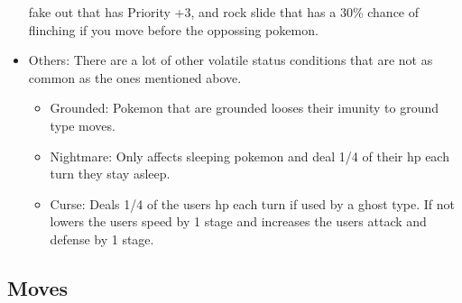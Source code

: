\begin{itemize}
    fake out that has Priority +3, and rock slide that has a 30\% chance of flinching if you move before the oppossing pokemon.
  \item Others: There are a lot of other volatile status conditions that are not as common as the ones mentioned above.
  \begin{itemize}
    \item Grounded: Pokemon that are grounded looses their imunity to ground type moves.
    \item Nightmare: Only affects sleeping pokemon and deal 1/4 of their hp each turn they stay asleep.
    \item Curse: Deals 1/4 of the users hp each turn if used by a ghost type. If not lowers the users speed by 1 stage and increases 
      the users attack and defense by 1 stage.
  \end{itemize}
\end{itemize}
\subsection{Moves}
